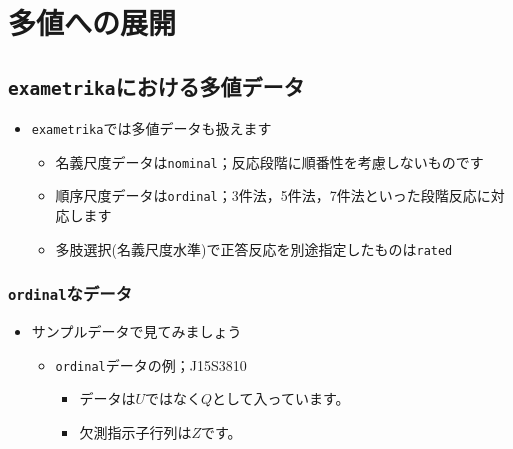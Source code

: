 \documentclass[
  a4paper,
]{ltjsbook}
\providecommand{\tightlist}{%
  \setlength{\itemsep}{0pt}\setlength{\parskip}{0pt}}\usepackage{longtable,booktabs,array}
\begin{document}
\section{多値への展開}\label{ux591aux5024ux3078ux306eux5c55ux958b}

\subsection{\texorpdfstring{\texttt{exametrika}における多値データ}{exametrikaにおける多値データ}}\label{exametrikaux306bux304aux3051ux308bux591aux5024ux30c7ux30fcux30bf}

\begin{itemize}
\tightlist
\item
  \texttt{exametrika}では多値データも扱えます

  \begin{itemize}
  \tightlist
  \item
    名義尺度データは\texttt{nominal}；反応段階に順番性を考慮しないものです
  \item
    順序尺度データは\texttt{ordinal}；3件法，5件法，7件法といった段階反応に対応します
  \item
    多肢選択(名義尺度水準)で正答反応を別途指定したものは\texttt{rated}
  \end{itemize}
\end{itemize}

\subsubsection{\texorpdfstring{\texttt{ordinal}なデータ}{ordinalなデータ}}\label{ordinalux306aux30c7ux30fcux30bf}

\begin{itemize}
\tightlist
\item
  サンプルデータで見てみましょう

  \begin{itemize}
  \tightlist
  \item
    \texttt{ordinal}データの例；J15S3810

    \begin{itemize}
    \tightlist
    \item
      データは\(U\)ではなく\(Q\)として入っています。
    \item
      欠測指示子行列は\(Z\)です。
    \end{itemize}
  \end{itemize}
\end{itemize}
\end{document}

